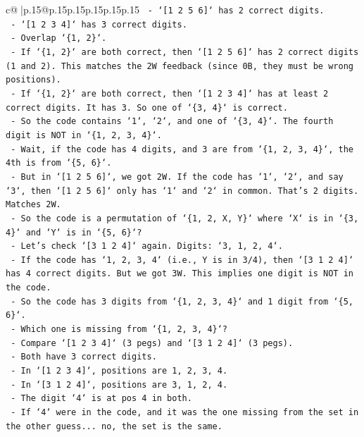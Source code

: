 \documentclass{article}
\begin{document}
{\begin{supertabular}{c@{$\;$}|p{.15\linewidth}@{}p{.15\linewidth}p{.15\linewidth}p{.15\linewidth}p{.15\linewidth}p{.15\linewidth}}
{{{\texttt{        {-} `{[}1 2 5 6{]}` has 2 correct digits.} \\
\texttt{        {-} `{[}1 2 3 4{]}` has 3 correct digits.} \\
\texttt{        {-} Overlap `\{1, 2\}`.} \\
\texttt{        {-} If `\{1, 2\}` are both correct, then `{[}1 2 5 6{]}` has 2 correct digits (1 and 2). This matches the 2W feedback (since 0B, they must be wrong positions).} \\
\texttt{        {-} If `\{1, 2\}` are both correct, then `{[}1 2 3 4{]}` has at least 2 correct digits. It has 3. So one of `\{3, 4\}` is correct.} \\
\texttt{        {-} So the code contains `1`, `2`, and one of `\{3, 4\}`. The fourth digit is NOT in `\{1, 2, 3, 4\}`.} \\
\texttt{        {-} Wait, if the code has 4 digits, and 3 are from `\{1, 2, 3, 4\}`, the 4th is from `\{5, 6\}`.} \\
\texttt{        {-} But in `{[}1 2 5 6{]}`, we got 2W. If the code has `1`, `2`, and say `3`, then `{[}1 2 5 6{]}` only has `1` and `2` in common. That's 2 digits. Matches 2W.} \\
\texttt{        {-} So the code is a permutation of `\{1, 2, X, Y\}` where `X` is in `\{3, 4\}` and `Y` is in `\{5, 6\}`?} \\
\texttt{        {-} Let's check `{[}3 1 2 4{]}` again. Digits: `3, 1, 2, 4`.} \\
\texttt{        {-} If the code has `1, 2, 3, 4` (i.e., Y is in 3/4), then `{[}3 1 2 4{]}` has 4 correct digits. But we got 3W. This implies one digit is NOT in the code.} \\
\texttt{        {-} So the code has 3 digits from `\{1, 2, 3, 4\}` and 1 digit from `\{5, 6\}`.} \\
\texttt{        {-} Which one is missing from `\{1, 2, 3, 4\}`?} \\
\texttt{        {-} Compare `{[}1 2 3 4{]}` (3 pegs) and `{[}3 1 2 4{]}` (3 pegs).} \\
\texttt{        {-} Both have 3 correct digits.} \\
\texttt{        {-} In `{[}1 2 3 4{]}`, positions are 1, 2, 3, 4.} \\
\texttt{        {-} In `{[}3 1 2 4{]}`, positions are 3, 1, 2, 4.} \\
\texttt{        {-} The digit `4` is at pos 4 in both.} \\
\texttt{        {-} If `4` were in the code, and it was the one missing from the set in the other guess... no, the set is the same.} \\
}}}
\end{supertabular}}
\end{document}
